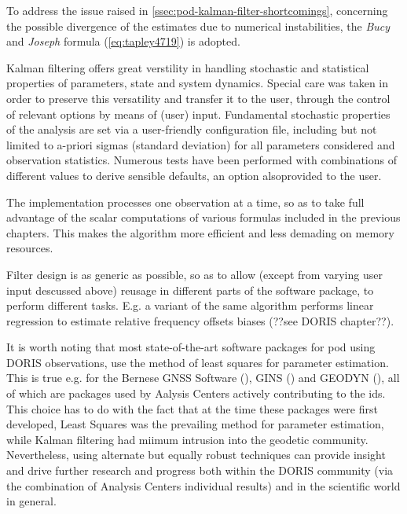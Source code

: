 To address the issue raised in \autoref{ssec:pod-kalman-filter-shortcomings}, 
concerning the possible divergence of the estimates due to numerical instabilities, 
the \emph{Bucy} and \emph{Joseph} formula (\autoref{eq:tapley4719}) is adopted.

Kalman filtering offers great verstility in handling stochastic and statistical 
properties of parameters, state and system dynamics. Special care was taken in 
order to preserve this versatility and transfer it to the user, through the control
of relevant options by means of (user) input. Fundamental stochastic properties of 
the analysis are set via a user-friendly configuration file, including but not 
limited to a-priori sigmas (standard deviation) for all parameters considered and 
observation statistics. Numerous tests have been performed with combinations of 
different values to derive sensible defaults, an option alsoprovided to the user.

The implementation processes one observation at a time, so as to take full advantage 
of the scalar computations of various formulas included in the previous chapters. 
This makes the algorithm more efficient and less demading on memory resources.

Filter design is as generic as possible, so as to allow (except from varying user 
input descussed above) reusage in different parts of the software package, to perform 
different tasks. E.g. a variant of the same algorithm performs linear regression 
to estimate relative frequency offsets biases (??see DORIS chapter??).

It is worth noting that most state-of-the-art software packages for \gls{pod} using 
DORIS observations, use the method of least squares for parameter estimation. This 
is true e.g. for the Bernese GNSS Software (\cite{Dach2015}), GINS (\cite{Gins2013}) and 
GEODYN (\cite{Geodyn2015}), all of which are packages used by Aalysis Centers 
actively contributing to the \gls{ids}. This choice has to do with the fact that 
at the time these packages were first developed, Least Squares was the prevailing 
method for parameter estimation, while Kalman filtering had miimum intrusion into the 
geodetic community. Nevertheless, using alternate but equally robust techniques 
can provide insight and drive further research and progress both within the DORIS 
community (via the combination of Analysis Centers individual results) and in the 
scientific world in general.
